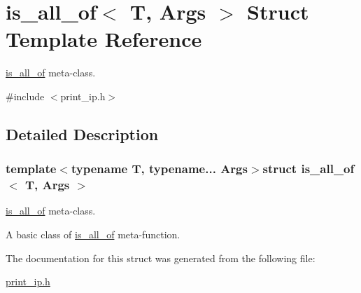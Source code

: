 \hypertarget{structis__all__of}{\section{is\-\_\-all\-\_\-of$<$ T, Args $>$ Struct Template Reference}
\label{structis__all__of}
}


\hyperlink{structis__all__of}{is\-\_\-all\-\_\-of} meta-\/class.  




{\ttfamily \#include $<$print\-\_\-ip.\-h$>$}



\subsection{Detailed Description}
\subsubsection*{template$<$typename T, typename... Args$>$struct is\-\_\-all\-\_\-of$<$ T, Args $>$}

\hyperlink{structis__all__of}{is\-\_\-all\-\_\-of} meta-\/class. 

A basic class of \hyperlink{structis__all__of}{is\-\_\-all\-\_\-of} meta-\/function. 

The documentation for this struct was generated from the following file\-:\begin{DoxyCompactItemize}
\item 
\hyperlink{print__ip_8h}{print\-\_\-ip.\-h}\end{DoxyCompactItemize}
